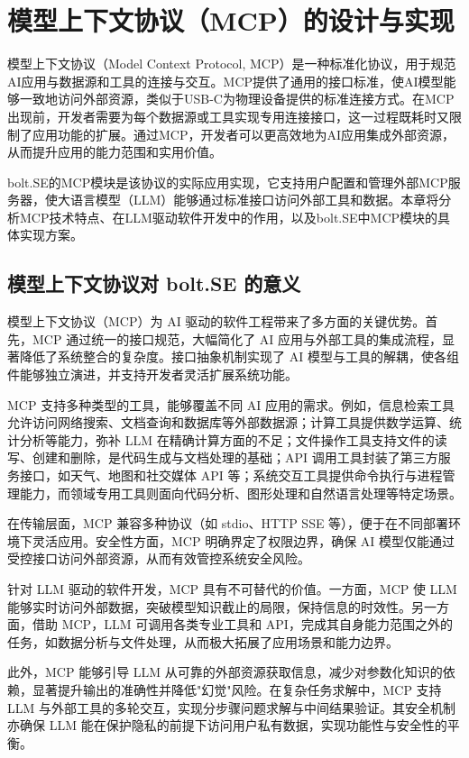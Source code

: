 
\chapter{模型上下文协议（MCP）的设计与实现}
\label{chap:mcp}

模型上下文协议（Model Context Protocol, MCP）是一种标准化协议，用于规范AI应用与数据源和工具的连接与交互。MCP提供了通用的接口标准，使AI模型能够一致地访问外部资源，类似于USB-C为物理设备提供的标准连接方式。在MCP出现前，开发者需要为每个数据源或工具实现专用连接接口，这一过程既耗时又限制了应用功能的扩展。通过MCP，开发者可以更高效地为AI应用集成外部资源，从而提升应用的能力范围和实用价值\cite{mcpspec2023}。

bolt.SE的MCP模块是该协议的实际应用实现，它支持用户配置和管理外部MCP服务器，使大语言模型（LLM）能够通过标准接口访问外部工具和数据。本章将分析MCP技术特点、在LLM驱动软件开发中的作用，以及bolt.SE中MCP模块的具体实现方案。

\section{模型上下文协议对 bolt.SE 的意义}

模型上下文协议（MCP）为 AI 驱动的软件工程带来了多方面的关键优势。首先，MCP 通过统一的接口规范，大幅简化了 AI 应用与外部工具的集成流程，显著降低了系统整合的复杂度。接口抽象机制实现了 AI 模型与工具的解耦，使各组件能够独立演进，并支持开发者灵活扩展系统功能。

MCP 支持多种类型的工具，能够覆盖不同 AI 应用的需求。例如，信息检索工具允许访问网络搜索、文档查询和数据库等外部数据源；计算工具提供数学运算、统计分析等能力，弥补 LLM 在精确计算方面的不足；文件操作工具支持文件的读写、创建和删除，是代码生成与文档处理的基础；API 调用工具封装了第三方服务接口，如天气、地图和社交媒体 API 等；系统交互工具提供命令执行与进程管理能力，而领域专用工具则面向代码分析、图形处理和自然语言处理等特定场景。

在传输层面，MCP 兼容多种协议（如 stdio、HTTP SSE 等），便于在不同部署环境下灵活应用。安全性方面，MCP 明确界定了权限边界，确保 AI 模型仅能通过受控接口访问外部资源，从而有效管控系统安全风险。

针对 LLM 驱动的软件开发，MCP 具有不可替代的价值。一方面，MCP 使 LLM 能够实时访问外部数据，突破模型知识截止的局限，保持信息的时效性。另一方面，借助 MCP，LLM 可调用各类专业工具和 API，完成其自身能力范围之外的任务，如数据分析与文件处理，从而极大拓展了应用场景和能力边界。

此外，MCP 能够引导 LLM 从可靠的外部资源获取信息，减少对参数化知识的依赖，显著提升输出的准确性并降低"幻觉"风险。在复杂任务求解中，MCP 支持 LLM 与外部工具的多轮交互，实现分步骤问题求解与中间结果验证。其安全机制亦确保 LLM 能在保护隐私的前提下访问用户私有数据，实现功能性与安全性的平衡。

